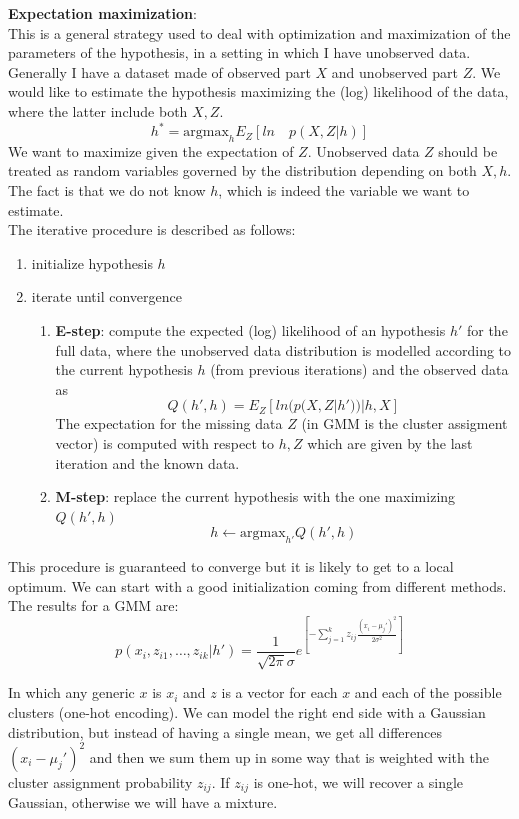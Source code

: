 \textbf{Expectation maximization}:\\ This is a general strategy used to deal
with optimization and maximization of the parameters of the hypothesis, in a setting
in which I have unobserved data. Generally I have a dataset made of observed
part $X$ and unobserved part $Z$. We would like to estimate the hypothesis maximizing
the (log) likelihood of the data, where the latter include both $X, Z$.
\[
	h^{*}= \text{argmax}_{h}E_{Z}[ln \quad p(X, Z | h)]
\]
We want to maximize given the expectation of $Z$. Unobserved data $Z$ should be
treated as random variables governed by the distribution depending on both
$X, h$. The fact is that we do not know $h$, which is indeed the variable we
want to estimate.\\ The iterative procedure is described as follows:
\begin{enumerate}
	\item initialize hypothesis $h$

	\item iterate until convergence
		\begin{enumerate}
			\item \textbf{E-step}: compute the expected (log) likelihood of an hypothesis
				$h'$ for the full data, where the unobserved data distribution is
				modelled according to the current hypothesis $h$ (from previous iterations)
				and the observed data as
				\[
					Q(h', h) = E_{Z}[ln (p(X, Z | h'))|h, X]
				\]
				The expectation for the missing data $Z$ (in GMM is the cluster assigment
				vector) is computed with respect to $h, Z$ which are given by the last
				iteration and the known data.

			\item \textbf{M-step}: replace the current hypothesis with the one maximizing
				$Q(h', h)$
				\[
					h \leftarrow \text{argmax}_{h'}Q(h', h)
				\]
		\end{enumerate}
\end{enumerate}

This procedure is guaranteed to converge but it is likely to get to a local
optimum. We can start with a good initialization coming from different methods.
\\

The results for a GMM are:
\[
	p(x_{i}, z_{i1}, \dots, z_{ik}| h') = \frac{1}{\sqrt{2 \pi} \sigma}e^{ \left[
	- \sum _{j=1} ^k z_{ij} \frac{(x_{i}- \mu_{j}')^{2}}{2 \sigma^{2}} \right]}
\]

In which any generic $x$ is $x_{i}$ and $z$ is a vector for each $x$ and each of
the possible clusters (one-hot encoding). We can model the right end side with a
Gaussian distribution, but instead of having a single mean, we get all
differences $(x_{i}- \mu_{j}')^{2}$ and then we sum them up in some way that is
weighted with the cluster assignment probability $z_{ij}$. If $z_{ij}$ is one-hot,
we will recover a single Gaussian, otherwise we will have a mixture. \\


